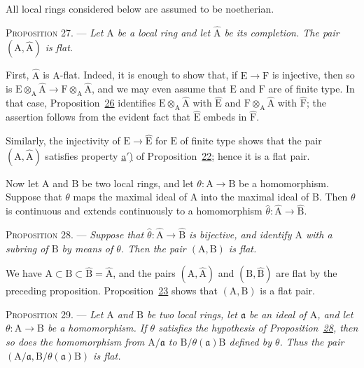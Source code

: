 
All local rings considered below are assumed to be noetherian.

\textsc{Proposition 27}. --- \emph{Let $\mathrm{A}$ be a
local ring and let $\widehat{\mathrm{A}}$ be its completion. The pair
$(\mathrm{A},\widehat{\mathrm{A}})$ is flat.}

First, $\widehat{\mathrm{A}}$ is $\mathrm{A}$-flat. Indeed, it is enough to show that, if
$\mathrm{E}\to \mathrm{F}$ is injective, then so is
$\mathrm{E}\otimes_\mathrm{A}\widehat{\mathrm{A}}\to \mathrm{F}\otimes_\mathrm{A}\widehat{\mathrm{A}}$, and we may even assume
that $\mathrm{E}$ and $\mathrm{F}$ are of finite type. In that case,
Proposition~\hyperref[gaga:prop:26]{26} identifies
$\mathrm{E}\otimes_\mathrm{A}\widehat{\mathrm{A}}$ with $\widehat{\mathrm{E}}$ and
$\mathrm{F}\otimes_\mathrm{A}\widehat{\mathrm{A}}$ with $\widehat{\mathrm{F}}$; the assertion follows from the
evident fact that $\widehat{\mathrm{E}}$ embeds in $\widehat{\mathrm{F}}$.

Similarly, the injectivity of $\mathrm{E}\to\widehat{\mathrm{E}}$ for $\mathrm{E}$ of finite type shows
that the pair $(\mathrm{A},\widehat{\mathrm{A}})$ satisfies property
\hyperref[gaga:prop:22:item:a]{a$'$)} of
Proposition~\hyperref[gaga:prop:22]{22}; hence it is a flat pair.

Now let $\mathrm{A}$ and $\mathrm{B}$ be two local rings, and let $\theta:\mathrm{A}\to \mathrm{B}$ be a
homomorphism. Suppose that $\theta$ maps the maximal ideal of $\mathrm{A}$ into the
maximal ideal of $\mathrm{B}$. Then $\theta$ is continuous and extends continuously to
a homomorphism $\widehat{\theta}:\widehat{\mathrm{A}}\to\widehat{\mathrm{B}}$.

\textsc{Proposition 28}. --- \emph{Suppose that
$\widehat{\theta}:\widehat{\mathrm{A}}\to\widehat{\mathrm{B}}$ is bijective, and identify $\mathrm{A}$
with a subring of $\mathrm{B}$ by means of $\theta$. Then the pair $(\mathrm{A},\mathrm{B})$ is flat.}

We have $\mathrm{A}\subset \mathrm{B}\subset\widehat{\mathrm{B}}=\widehat{\mathrm{A}}$, and the pairs
$(\mathrm{A},\widehat{\mathrm{A}})$ and $(\mathrm{B},\widehat{\mathrm{B}})$ are flat by the preceding proposition.
Proposition~\hyperref[gaga:prop:23]{23} shows that $(\mathrm{A},\mathrm{B})$ is a flat pair.

\textsc{Proposition 29}. --- \emph{Let $\mathrm{A}$ and $\mathrm{B}$
be two local rings, let $\mathfrak{a}$ be an ideal of $\mathrm{A}$, and let
$\theta:\mathrm{A}\to \mathrm{B}$ be a homomorphism. If $\theta$ satisfies the hypothesis of
Proposition~\hyperref[gaga:prop:28]{28}, then so does the homomorphism from
$\mathrm{A}/\mathfrak{a}$ to $\mathrm{B}/\theta(\mathfrak{a})\mathrm{B}$ defined by $\theta$. Thus the
pair $(\mathrm{A}/\mathfrak{a},\mathrm{B}/\theta(\mathfrak{a})\mathrm{B})$ is flat.}

